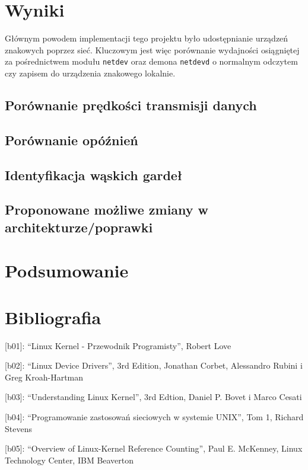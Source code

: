 \section{Wyniki}

Głównym powodem implementacji tego projektu było udostępnianie urządzeń
znakowych poprzez sieć. Kluczowym jest więc porównanie wydajności
osiągniętej za pośrednictwem modułu \texttt{netdev} oraz demona
\texttt{netdevd} o normalnym odczytem czy zapisem do urządzenia
znakowego lokalnie.

\subsection{Porównanie prędkości transmisji danych}

\subsection{Porównanie opóźnień}

\subsection{Identyfikacja wąskich gardeł}

\subsection{Proponowane możliwe zmiany w architekturze/poprawki}

\section{Podsumowanie}

\section{Bibliografia}

{[}b01{]}: ``Linux Kernel - Przewodnik Programisty'', Robert Love

{[}b02{]}: ``Linux Device Drivers'', 3rd Edition, Jonathan Corbet,
Alessandro Rubini i Greg Kroah-Hartman

{[}b03{]}: ``Understanding Linux Kernel'', 3rd Edtion, Daniel P. Bovet i
Marco Cesati

{[}b04{]}: ``Programowanie zastosowań sieciowych w systemie UNIX'', Tom
1, Richard Stevens

{[}b05{]}: ``Overview of Linux-Kernel Reference Counting'', Paul E.
McKenney, Linux Technology Center, IBM Beaverton

